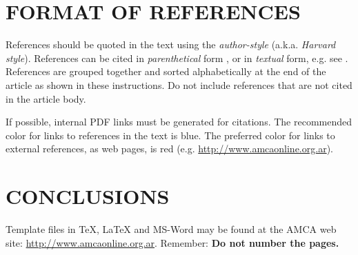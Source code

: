 \documentclass[oneside,a4paper,english,links]{amca}
\begin{document}
\section{FORMAT OF REFERENCES}

References should be quoted in the text using the \emph{author-style}
(a.k.a. \emph{Harvard style}). References can be cited in
\emph{parenthetical} form \citep{zienkiewicz91,idelsohn94,meyer82,meyer82b}, or
in \emph{textual} form, e.g. see
\citet{zienkiewicz91,idelsohn94,meyer82,meyer82b}.  References are grouped
together and sorted alphabetically at the end of the article as shown
in these instructions. Do not include references that are not cited in
the article body. 

If possible, internal PDF links must be generated for citations. The
recommended color for links to references in the text is blue. The
preferred color for links to external references, as web pages, 
is red (e.g. \url{http://www.amcaonline.org.ar}).

\section{CONCLUSIONS}

Template files in TeX, \LaTeX{} and MS-Word may be found at the
AMCA web site: \url{http://www.amcaonline.org.ar}. 
Remember: {\bf Do not number the pages.}
%

\end{document}

